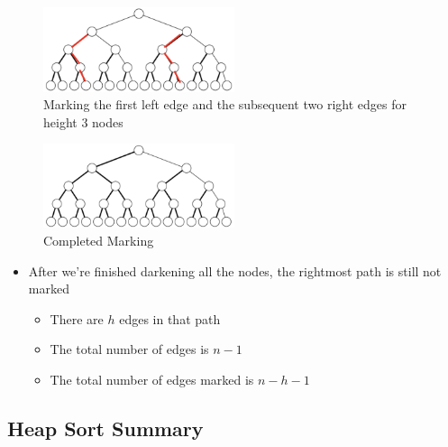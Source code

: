 \documentclass[
  10pt,
  english,
  letterpaper,
,tablecaptionabove
]{scrartcl}
\providecommand{\tightlist}{%
  \setlength{\itemsep}{0pt}\setlength{\parskip}{0pt}}
\begin{document}
\begin{figure}
\centering
\includegraphics[width=0.5\textwidth,height=\textheight]{images/8.png}
\caption{Marking the first left edge and the subsequent two right edges
for height 3 nodes}
\end{figure}

\begin{figure}
\centering
\includegraphics[width=0.5\textwidth,height=\textheight]{images/9.png}
\caption{Completed Marking}
\end{figure}

\begin{itemize}
\tightlist
\item
  After we're finished darkening all the nodes, the rightmost path is
  still not marked

  \begin{itemize}
  \tightlist
  \item
    There are \(h\) edges in that path
  \item
    The total number of edges is \(n-1\)
  \item
    The total number of edges marked is \(n-h-1\)
  \end{itemize}
\end{itemize}

\hypertarget{heap-sort-summary}{%
\subsection{Heap Sort Summary}\label{heap-sort-summary}}
\end{document}
